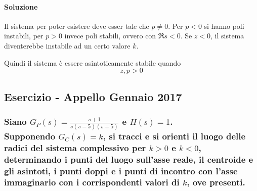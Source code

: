 \paragraph{Soluzione}
Il sistema per poter esistere deve esser tale che \(p\neq0\).
Per \(p<0\) si hanno poli instabili, per \(p>0\) invece poli stabili, ovvero con
\(\Re s<0\).
Se \(z<0\), il sistema diventerebbe instabile ad un certo valore \(k\).

Quindi il sistema è essere asintoticamente stabile quando
\[
	z,p > 0
\]

\subsection{Esercizio - Appello Gennaio 2017}
\begin{center}\end{center}

\subsubsection{
Siano \(\displaystyle G_P(s) = \frac{s+1}{s(s-5)(s+5)}\) e \(H(s) = 1\). \\
Supponendo \(G_C(s)=k\), si tracci e si orienti il luogo delle radici del sistema complessivo per \(k>0\) e \(k<0\), determinando i punti del luogo sull'asse reale, il centroide e gli asintoti, i punti doppi e i punti di incontro con l'asse immaginario con i corrispondenti valori di \(k\), ove presenti.
}

